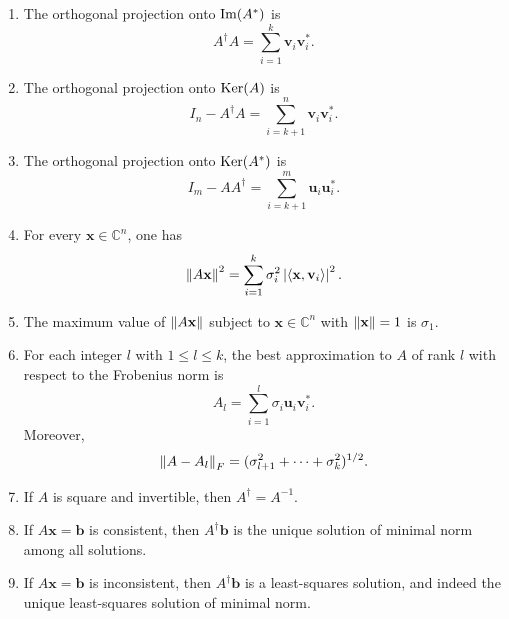 \begin{theorem}
\begin{enumerate}
\[    \]
    \item[(j)] The orthogonal projection onto $\operatorname{Im}(A^*)$ is
    \[
    A^\dagger A
    =
    \sum_{i=1}^k \mathbf{v}_i\mathbf{v}_i^*.
    \]
    \item[(k)] The orthogonal projection onto $\operatorname{Ker}(A)$ is
    \[
    I_n-A^\dagger A
    =
    \sum_{i=k+1}^n \mathbf{v}_i\mathbf{v}_i^*.
    \]
    \item[(l)] The orthogonal projection onto $\operatorname{Ker}(A^*)$ is
    \[
    I_m-AA^\dagger
    =
    \sum_{i=k+1}^m \mathbf{u}_i\mathbf{u}_i^*.
    \]
    \item[(m)] For every $\mathbf{x}\in\mathbb{C}^n$, one has
    \[
    \left\lVert A\mathbf{x} \right\rVert^2
    =
    \sum_{i=1}^k \sigma_i^2\left\lvert \left\langle \mathbf{x}, \mathbf{v}_i \right\rangle \right\rvert^2.
    \]
    \item[(n)] The maximum value of $\left\lVert A\mathbf{x} \right\rVert$ subject to $\mathbf{x}\in\mathbb{C}^n$ with $\left\lVert \mathbf{x} \right\rVert=1$ is $\sigma_1$.
    \item[(o)] For each integer $l$ with $1\le l\le k$, the best approximation to $A$ of rank $l$ with respect to the Frobenius norm is
    \[
    A_l
    =
    \sum_{i=1}^l \sigma_i\mathbf{u}_i\mathbf{v}_i^*.
    \]
    Moreover,
    \[
    \left\lVert A-A_l \right\rVert_F
    =
    (\sigma_{l+1}^2+\dots+\sigma_k^2)^{1/2}.
    \]
    \item[(p)] If $A$ is square and invertible, then $A^\dagger=A^{-1}$.
    \item[(q)] If $A\mathbf{x}=\mathbf{b}$ is consistent, then $A^\dagger\mathbf{b}$ is the unique solution of minimal norm among all solutions.
    \item[(r)] If $A\mathbf{x}=\mathbf{b}$ is inconsistent, then $A^\dagger\mathbf{b}$ is a least-squares solution, and indeed the unique least-squares solution of minimal norm.
\end{enumerate}
\end{theorem}


